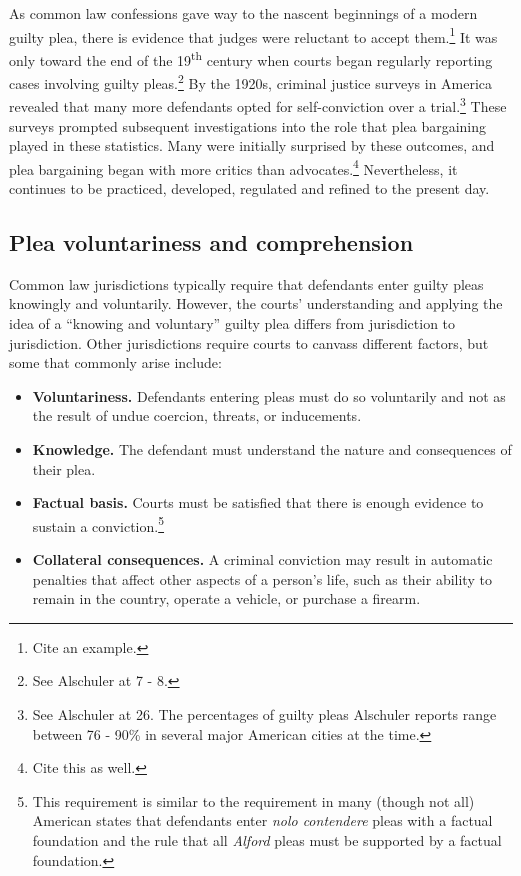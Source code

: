 As common law confessions gave way to the nascent beginnings of a modern guilty plea, there is evidence that judges were reluctant to accept them.\footnote{Cite an example.} It was only toward the end of the 19\textsuperscript{th} century when courts began regularly reporting cases involving guilty pleas.\footnote{See Alschuler at 7 - 8.} By the 1920s, criminal justice surveys in America revealed that many more defendants opted for self-conviction over a trial.\footnote{See Alschuler at 26. The percentages of guilty pleas Alschuler reports range between 76 - 90\% in several major American cities at the time.} These surveys prompted subsequent investigations into the role that plea bargaining played in these statistics. Many were initially surprised by these outcomes, and plea bargaining began with more critics than advocates.\footnote{Cite this as well.} Nevertheless, it continues to be practiced, developed, regulated and refined to the present day.

\subsection{Plea voluntariness and comprehension}

Common law jurisdictions typically require that defendants enter guilty pleas knowingly and voluntarily. However, the courts' understanding and applying the idea of a ``knowing and voluntary'' guilty plea differs from jurisdiction to jurisdiction. Other jurisdictions require courts to canvass different factors, but some that commonly arise include:

\begin{itemize}
\item \textbf{Voluntariness.} Defendants entering pleas must do so voluntarily and not as the result of undue coercion, threats, or inducements.
\item \textbf{Knowledge.} The defendant must understand the nature and consequences of their plea.
\item \textbf{Factual basis.} Courts must be satisfied that there is enough evidence to sustain a conviction.\footnote{This requirement is similar to the requirement in many (though not all) American states that defendants enter \textit{nolo contendere} pleas with a factual foundation and the rule that all \textit{Alford} pleas must be supported by a factual foundation.}
\item \textbf{Collateral consequences.} A criminal conviction may result in automatic penalties that affect other aspects of a person's life, such as their ability to remain in the country, operate a vehicle, or purchase a firearm.
\end{itemize}

